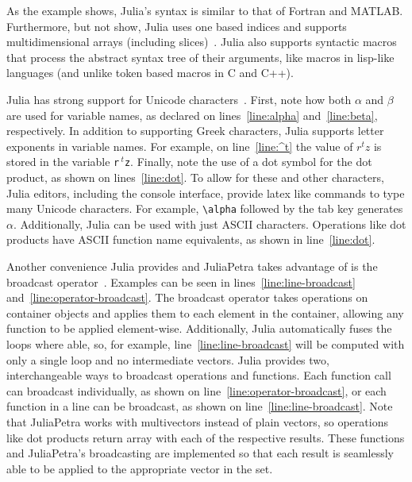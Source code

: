 \documentclass[acmsmall]{acmart}
\begin{document}
	As the example shows, Julia's syntax is similar to that of Fortran and MATLAB.
	Furthermore, but not show, Julia uses one based indices and supports multidimensional arrays (including slices)~\cite{Bezanson:2017:FreshApproach}.
	Julia also supports syntactic macros that process the abstract syntax tree of their arguments, like macros in lisp-like languages (and unlike token based macros in C and C++).
	
	
	Julia has strong support for Unicode characters~\cite{Bezanson:2017:FreshApproach}.
	First, note how both \(\alpha\) and \(\beta\) are used for variable names, as declared on lines~\ref{line:alpha} and~\ref{line:beta}, respectively.
	In addition to supporting Greek characters, Julia supports letter exponents in variable names.
	For example, on line~\ref{line:^t} the value of \(r^tz\) is stored in the variable \texttt{r$\,^t$z}. %
	Finally, note the use of a dot symbol for the dot product, as shown on lines~\ref{line:dot}.
	To allow for these and other characters, Julia editors, including the console interface, provide latex like commands to type many Unicode characters.
	For example, \texttt{\textbackslash alpha} followed by the tab key generates \(\alpha\).
	Additionally, Julia can be used with just ASCII characters.
	Operations like dot products have ASCII function name equivalents, as shown in line~\ref{line:dot}.
	
	Another convenience Julia provides and JuliaPetra takes advantage of is the broadcast operator~\cite{Bezanson:2017:FreshApproach}.
	Examples can be seen in lines~\ref{line:line-broadcast} and~\ref{line:operator-broadcast}.
	The broadcast operator takes operations on container objects and applies them to each element in the container, allowing any function to be applied element-wise.
	Additionally, Julia automatically fuses the loops where able, so, for example, line~\ref{line:line-broadcast} will be computed with only a single loop and no intermediate vectors.
	Julia provides two, interchangeable ways to broadcast operations and functions.
	Each function call can broadcast individually, as shown on line~\ref{line:operator-broadcast}, or each function in a line can be broadcast, as shown on line~\ref{line:line-broadcast}.
	Note that JuliaPetra works with multivectors instead of plain vectors, so operations like dot products return array with each of the respective results.
	These functions and JuliaPetra's broadcasting are implemented so that each result is seamlessly able to be applied to the appropriate vector in the set.
	
\end{document}
